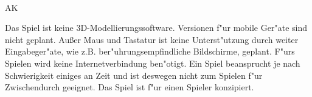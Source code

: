 ~\\

\begin{ids}{\gls{AK}}

	
	\id[10] Das Spiel ist keine 3D-Modellierungssoftware.
	\id[20] Versionen f{"u}r mobile Ger{"a}te sind nicht geplant.
	\id[20] Außer Maus und Tastatur ist keine Unterst{"u}tzung durch weiter Eingabeger{"a}te, \id[60]wie z.B.  ber{"u}hrungsempfindliche Bildschirme, geplant.
	\id[40]F{"u}rs Spielen wird keine Internetverbindung ben{"o}tigt. 
	\id[50] Ein Spiel beansprucht je nach Schwierigkeit einiges an Zeit und ist deswegen nicht \id[60]zum Spielen f{"u}r Zwischendurch geeignet.
	\id[60] Das Spiel ist f{"u}r einen Spieler konzipiert.
	
\end{ids}


